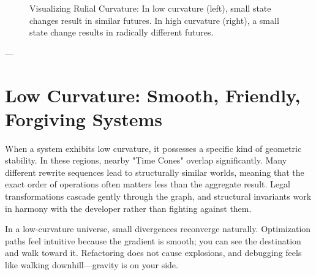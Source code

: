 \begin{figure}[h]
\centering
{}
\caption{Visualizing Rulial Curvature: In low curvature (left), small state changes result in similar futures. In high curvature (right), a small state change results in radically different futures.}
\end{figure}

---

\section{\texorpdfstring{\textbf{Low Curvature: Smooth, Friendly, Forgiving Systems}}{9.2 --- Low Curvature: Smooth, Friendly, Forgiving Systems}}

When a system exhibits low curvature, it possesses a specific kind of geometric stability. In these regions, nearby "Time Cones" overlap significantly. Many different rewrite sequences lead to structurally similar worlds, meaning that the exact order of operations often matters less than the aggregate result. Legal transformations cascade gently through the graph, and structural invariants work in harmony with the developer rather than fighting against them.

In a low-curvature universe, small divergences reconverge naturally. Optimization paths feel intuitive because the gradient is smooth; you can see the destination and walk toward it. Refactoring does not cause explosions, and debugging feels like walking downhill—gravity is on your side.

